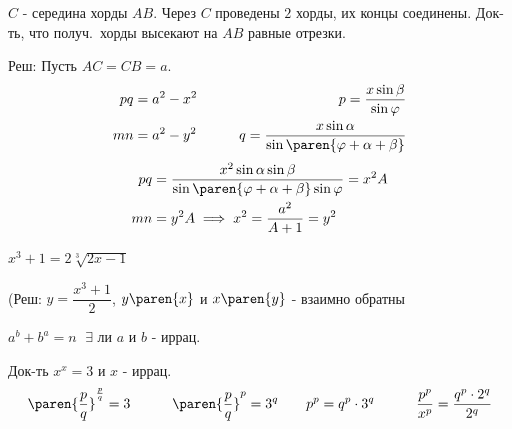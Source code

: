 \documentclass{article}
\newcommand{\strikethrough}[1]{}  %
\begin{document}
\problem  %
$C$ - середина хорды $AB$.
Через $C$ проведены $2$ хорды, их концы соединены.
Док-ть, что получ.\ хорды высекают на $AB$ равные отрезки.

Реш:
Пусть $AC = CB = a$.
\begin{alignat*}{2}
  p q &= a^2 - x^2  &\qquad  p = \frac{x \sin\beta}{\sin\varphi}  \\
  m n &= a^2 - y^2  &\qquad  q = \frac{x \sin\alpha}{\sin\paren{\varphi + \alpha + \beta}}
\end{alignat*}
\begin{align*}
  p q &= \frac{x^2 \sin\alpha \sin\beta}{\sin\paren{\varphi + \alpha + \beta} \sin\varphi}
       = x^2 A  \\
  m n &= y^2 A
  \implies
  x^2 = \frac{a^2}{A + 1}
      = y^2
\end{align*}


\problem  %
$x^3 + 1 = 2 \sqrt[3]{2 x - 1}$

(Реш: $y = \dfrac{x^3 + 1}{2}$, $y\paren{x}$ и $x\paren{y}$ - взаимно обратны


\problem  %
$a^b + b^a = n$
$\; \exists$ ли $a$ и $b$ - иррац.

Док-ть $x^x = 3$ и $x$ - иррац.
\begin{alignat*}{4}
  &\paren{\dfrac{p}{q}}^{\frac{p}{q}} = 3  \qquad
  &\paren{\dfrac{p}{q}}^{p} = 3^{q}  \qquad
  &p^p = q^{p} \cdot 3^{q}  \qquad
  &\frac{p^p}{x^p} = \frac{q^{p} \cdot 2^{q}}{2^{q}}
\end{alignat*}
\end{document}

